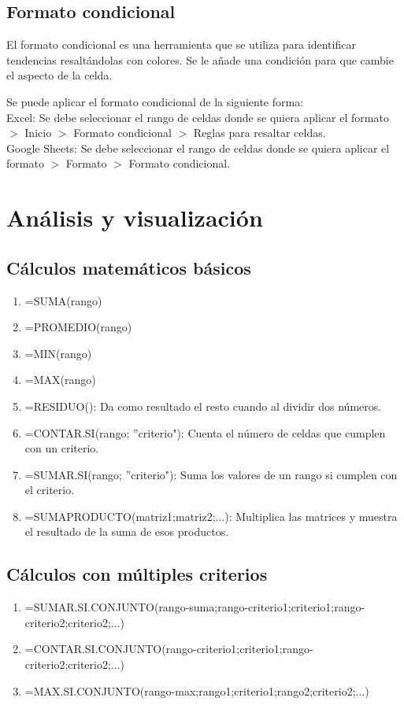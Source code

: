 \documentclass[a4paper, 12pt]{book}
\begin{document}
\subsection{Formato condicional}
El formato condicional es una herramienta que se utiliza para identificar tendencias resaltándolas con colores. Se le añade una condición para que cambie el aspecto de la celda.


Se puede aplicar el formato condicional de la siguiente forma: \\
Excel: Se debe seleccionar el rango de celdas donde se quiera aplicar el formato $>$ Inicio $>$ Formato condicional $>$ Reglas para resaltar celdas. \\
Google Sheets: Se debe seleccionar el rango de celdas donde se quiera aplicar el formato $>$ Formato $>$ Formato condicional.
\section{Análisis y visualización}
\subsection{Cálculos matemáticos básicos}
\begin{enumerate}
\item =SUMA(rango)
\item =PROMEDIO(rango)
\item =MIN(rango)
\item =MAX(rango)
\item =RESIDUO(): Da como resultado el resto cuando al dividir dos números.
\item =CONTAR.SI(rango; ''criterio"): Cuenta el número de celdas que cumplen con un criterio.
\item =SUMAR.SI(rango; ''criterio"): Suma los valores de un rango si cumplen con el criterio.
\item =SUMAPRODUCTO(matriz1;matriz2;...): Multiplica las matrices y muestra el resultado de la suma de esos productos.
\end{enumerate}
\subsection{Cálculos con múltiples criterios}
\begin{enumerate}
\item =SUMAR.SI.CONJUNTO(rango-suma;rango-criterio1;criterio1;rango-criterio2;criterio2;...)
\item =CONTAR.SI.CONJUNTO(rango-criterio1;criterio1;rango-criterio2;criterio2;...)
\item =MAX.SI.CONJUNTO(rango-max;rango1;criterio1;rango2;criterio2;...)
\end{enumerate}
\end{document}
